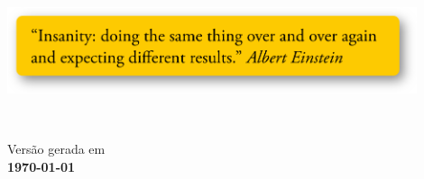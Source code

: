 \documentclass[a4paper,12pt,openany,]{book}
\begin{document}
\begin{center}
\begin{flushright}
\begin{minipage}[t]{12cm}
	\includegraphics[width=12cm]{einstein}\label{img:einstein}

\end{minipage} \\
\end{flushright}

\vspace{1cm}

{\small Versão gerada em \\ \bf \today } %
\end{center}

\tableofcontents








\printindex
\end{document}
